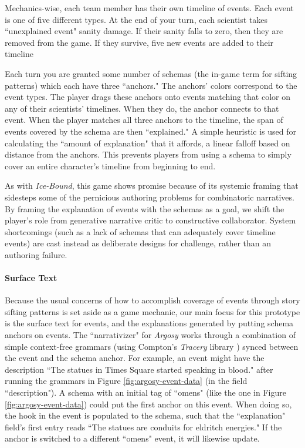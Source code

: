 Mechanics-wise, each team member has their own timeline of events. Each event is one of five different types. At the end of your turn, each scientist takes ``unexplained event" sanity damage. If their sanity falls to zero, then they are removed from the game. If they survive, five new events are added to their timeline

Each turn you are granted some number of schemas (the in-game term for sifting patterns) which each have three ``anchors." The anchors' colors correspond to the event types. The player drags these anchors onto events matching that color on any of their scientists' timelines. When they do, the anchor connects to that event. When the player matches all three anchors to the timeline, the span of events covered by the schema are then ``explained." A simple heuristic is used for calculating the ``amount of explanation" that it affords, a linear falloff based on distance from the anchors. This prevents players from using a schema to simply cover an entire character's timeline from beginning to end.

As with \textit{Ice-Bound}, this game shows promise because of its systemic framing that sidesteps some of the pernicious authoring problems for combinatoric narratives. By framing the explanation of events with the schemas as a goal, we shift the player's role from generative narrative critic to constructive collaborator. System shortcomings (such as a lack of schemas that can adequately cover timeline events) are cast instead as deliberate designs for challenge, rather than an authoring failure.

\paragraph{Surface Text}\label{par:argosy-surface-text}

Because the usual concerns of how to accomplish coverage of events through story sifting patterns is set aside as a game mechanic, our main focus for this prototype is the surface text for events, and the explanations generated by putting schema anchors on events. The ``narrativizer" for \textit{Argosy} works through a combination of simple context-free grammars (using Compton's \textit{Tracery} library \cite{compton2015tracery}) synced between the event and the schema anchor. For example, an event might have the description ``The statues in Times Square started speaking in blood." after running the grammars in Figure \ref{fig:argosy-event-data} (in the field ``description"). A schema with an initial tag of ``omens" (like the one in Figure \ref{fig:argosy-event-data}) could put the first anchor on this event. When doing so, the hook in the event is populated to the schema, such that the ``explanation" field's first entry reads ``The statues are conduits for eldritch energies." If the anchor is switched to a different ``omens" event, it will likewise update.

